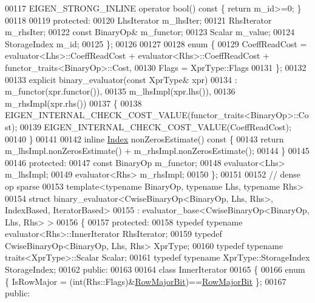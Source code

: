 \begin{DoxyCode}
00117     EIGEN\_STRONG\_INLINE \textcolor{keyword}{operator} bool()\textcolor{keyword}{ const }\{ \textcolor{keywordflow}{return} m\_id>=0; \}
00118 
00119   \textcolor{keyword}{protected}:
00120     LhsIterator m\_lhsIter;
00121     RhsIterator m\_rhsIter;
00122     \textcolor{keyword}{const} BinaryOp& m\_functor;
00123     Scalar m\_value;
00124     StorageIndex m\_id;
00125   \};
00126   
00127   
00128   \textcolor{keyword}{enum} \{
00129     CoeffReadCost = evaluator<Lhs>::CoeffReadCost + evaluator<Rhs>::CoeffReadCost + 
      functor\_traits<BinaryOp>::Cost,
00130     Flags = XprType::Flags
00131   \};
00132   
00133   \textcolor{keyword}{explicit} binary\_evaluator(\textcolor{keyword}{const} XprType& xpr)
00134     : m\_functor(xpr.functor()),
00135       m\_lhsImpl(xpr.lhs()), 
00136       m\_rhsImpl(xpr.rhs())  
00137   \{
00138     EIGEN\_INTERNAL\_CHECK\_COST\_VALUE(functor\_traits<BinaryOp>::Cost);
00139     EIGEN\_INTERNAL\_CHECK\_COST\_VALUE(CoeffReadCost);
00140   \}
00141   
00142   \textcolor{keyword}{inline} \hyperlink{namespace_eigen_a62e77e0933482dafde8fe197d9a2cfde}{Index} nonZerosEstimate()\textcolor{keyword}{ const }\{
00143     \textcolor{keywordflow}{return} m\_lhsImpl.nonZerosEstimate() + m\_rhsImpl.nonZerosEstimate();
00144   \}
00145 
00146 \textcolor{keyword}{protected}:
00147   \textcolor{keyword}{const} BinaryOp m\_functor;
00148   evaluator<Lhs> m\_lhsImpl;
00149   evaluator<Rhs> m\_rhsImpl;
00150 \};
00151 
00152 \textcolor{comment}{// dense op sparse}
00153 \textcolor{keyword}{template}<\textcolor{keyword}{typename} BinaryOp, \textcolor{keyword}{typename} Lhs, \textcolor{keyword}{typename} Rhs>
00154 \textcolor{keyword}{struct }binary\_evaluator<CwiseBinaryOp<BinaryOp, Lhs, Rhs>, IndexBased, IteratorBased>
00155   : evaluator\_base<CwiseBinaryOp<BinaryOp, Lhs, Rhs> >
00156 \{
00157 \textcolor{keyword}{protected}:
00158   \textcolor{keyword}{typedef} \textcolor{keyword}{typename} evaluator<Rhs>::InnerIterator  RhsIterator;
00159   \textcolor{keyword}{typedef} CwiseBinaryOp<BinaryOp, Lhs, Rhs> XprType;
00160   \textcolor{keyword}{typedef} \textcolor{keyword}{typename} traits<XprType>::Scalar Scalar;
00161   \textcolor{keyword}{typedef} \textcolor{keyword}{typename} XprType::StorageIndex StorageIndex;
00162 \textcolor{keyword}{public}:
00163 
00164   \textcolor{keyword}{class }InnerIterator
00165   \{
00166     \textcolor{keyword}{enum} \{ IsRowMajor = (int(Rhs::Flags)&\hyperlink{group__flags_gae4f56c2a60bbe4bd2e44c5b19cbe8762}{RowMajorBit})==\hyperlink{group__flags_gae4f56c2a60bbe4bd2e44c5b19cbe8762}{RowMajorBit} \};
00167   \textcolor{keyword}{public}:

\end{DoxyCode}
